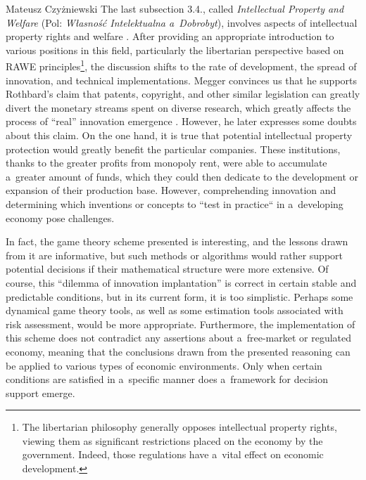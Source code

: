 \begin{newrevengenv}{Mateusz Czyżniewski}
The last subsection 3.4., called \textit{Intellectual Property and Welfare} (Pol: \textit{Własność Intelektualna a~Dobrobyt}), involves aspects of intellectual property rights and welfare 
\parencite[][pp.94–101]{megger_sprawiedliwosc_2021}. %
 After providing an appropriate introduction to various positions in this field, particularly the libertarian perspective based on RAWE principles\footnote{The libertarian philosophy generally opposes intellectual property rights, viewing them as significant restrictions placed on the economy by the government. Indeed, those regulations have a~vital effect on economic development.}, the discussion shifts to the rate of development, the spread of innovation, and technical implementations. Megger convinces us that he supports Rothbard's claim that patents, copyright, and other similar legislation can greatly divert the monetary streams spent on diverse research, which greatly affects the process of ``real'' innovation emergence 
\parencite[][p.97]{megger_sprawiedliwosc_2021}. %
 However, he later expresses some doubts about this claim. On the one hand, it is true that potential intellectual property protection would greatly benefit the particular companies. These institutions, thanks to the greater profits from monopoly rent, were able to accumulate a~greater amount of funds, which they could then dedicate to the development or expansion of their production base. However, comprehending innovation and determining which inventions or concepts to ``test in practice`` in a~developing economy pose challenges.



In fact, the game theory scheme presented 
\parencite[][p.98]{megger_sprawiedliwosc_2021} %
 is interesting, and the lessons drawn from it are informative, but such methods or algorithms would rather support potential decisions if their mathematical structure were more extensive. Of course, this ``dilemma of innovation implantation'' is correct in certain stable and predictable conditions, but in its current form, it is too simplistic. Perhaps some dynamical game theory tools, as well as some estimation tools associated with risk assessment, would be more appropriate. Furthermore, the implementation of this scheme does not contradict any assertions about a~free-market or regulated economy, meaning that the conclusions drawn from the presented reasoning can be applied to various types of economic environments. Only when certain conditions are satisfied in a~specific manner does a~framework for decision support emerge.




\end{newrevengenv}
